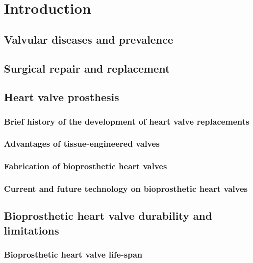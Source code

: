 \chapter{Introduction} %

\section{Valvular diseases and prevalence}



\section{Surgical repair and replacement}


\section{Heart valve prosthesis}

\subsection{Brief history of the development of heart valve replacements}

\subsection{Advantages of tissue-engineered valves}

\subsection{Fabrication of bioprosthetic heart valves}

\subsection{Current and future technology on bioprosthetic heart valves}


\section{Bioprosthetic heart valve durability and limitations}

\subsection{Bioprosthetic heart valve life-span}

